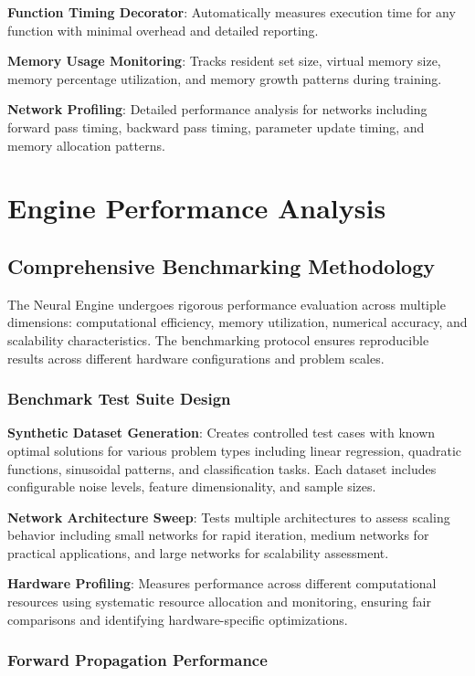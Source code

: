 \documentclass[11pt,a4paper]{report}
\begin{document}
\textbf{Function Timing Decorator}: Automatically measures execution time for any function with minimal overhead and detailed reporting.

\textbf{Memory Usage Monitoring}: Tracks resident set size, virtual memory size, memory percentage utilization, and memory growth patterns during training.

\textbf{Network Profiling}: Detailed performance analysis for networks including forward pass timing, backward pass timing, parameter update timing, and memory allocation patterns.

\section{Engine Performance Analysis}

\subsection{Comprehensive Benchmarking Methodology}

The Neural Engine undergoes rigorous performance evaluation across multiple dimensions: computational efficiency, memory utilization, numerical accuracy, and scalability characteristics. The benchmarking protocol ensures reproducible results across different hardware configurations and problem scales.

\subsubsection{Benchmark Test Suite Design}

\textbf{Synthetic Dataset Generation}: Creates controlled test cases with known optimal solutions for various problem types including linear regression, quadratic functions, sinusoidal patterns, and classification tasks. Each dataset includes configurable noise levels, feature dimensionality, and sample sizes.

\textbf{Network Architecture Sweep}: Tests multiple architectures to assess scaling behavior including small networks for rapid iteration, medium networks for practical applications, and large networks for scalability assessment.

\textbf{Hardware Profiling}: Measures performance across different computational resources using systematic resource allocation and monitoring, ensuring fair comparisons and identifying hardware-specific optimizations.

\subsubsection{Forward Propagation Performance}
\end{document}
